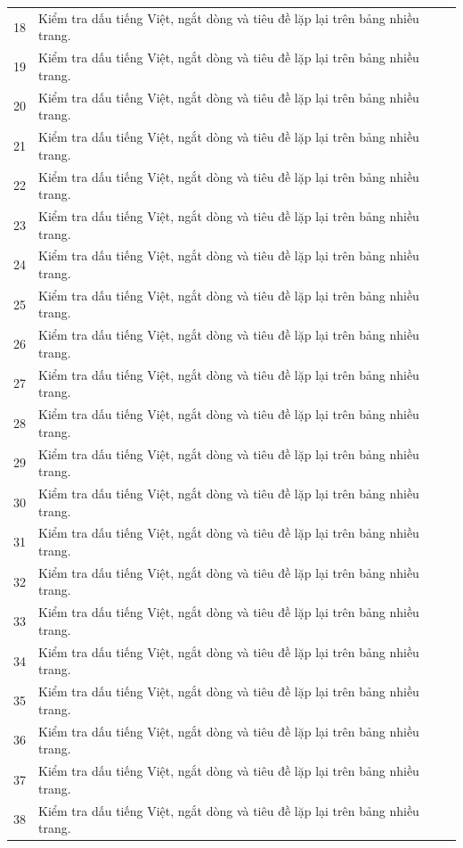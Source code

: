 \documentclass{template/ctu-report}
\begin{document}
\begin{longtable}{p{}p{}}
18 & Kiểm tra dấu tiếng Việt, ngắt dòng và tiêu đề lặp lại trên bảng nhiều trang. \\
19 & Kiểm tra dấu tiếng Việt, ngắt dòng và tiêu đề lặp lại trên bảng nhiều trang. \\
20 & Kiểm tra dấu tiếng Việt, ngắt dòng và tiêu đề lặp lại trên bảng nhiều trang. \\
21 & Kiểm tra dấu tiếng Việt, ngắt dòng và tiêu đề lặp lại trên bảng nhiều trang. \\
22 & Kiểm tra dấu tiếng Việt, ngắt dòng và tiêu đề lặp lại trên bảng nhiều trang. \\
23 & Kiểm tra dấu tiếng Việt, ngắt dòng và tiêu đề lặp lại trên bảng nhiều trang. \\
24 & Kiểm tra dấu tiếng Việt, ngắt dòng và tiêu đề lặp lại trên bảng nhiều trang. \\
25 & Kiểm tra dấu tiếng Việt, ngắt dòng và tiêu đề lặp lại trên bảng nhiều trang. \\
26 & Kiểm tra dấu tiếng Việt, ngắt dòng và tiêu đề lặp lại trên bảng nhiều trang. \\
27 & Kiểm tra dấu tiếng Việt, ngắt dòng và tiêu đề lặp lại trên bảng nhiều trang. \\
28 & Kiểm tra dấu tiếng Việt, ngắt dòng và tiêu đề lặp lại trên bảng nhiều trang. \\
29 & Kiểm tra dấu tiếng Việt, ngắt dòng và tiêu đề lặp lại trên bảng nhiều trang. \\
30 & Kiểm tra dấu tiếng Việt, ngắt dòng và tiêu đề lặp lại trên bảng nhiều trang. \\
31 & Kiểm tra dấu tiếng Việt, ngắt dòng và tiêu đề lặp lại trên bảng nhiều trang. \\
32 & Kiểm tra dấu tiếng Việt, ngắt dòng và tiêu đề lặp lại trên bảng nhiều trang. \\
33 & Kiểm tra dấu tiếng Việt, ngắt dòng và tiêu đề lặp lại trên bảng nhiều trang. \\
34 & Kiểm tra dấu tiếng Việt, ngắt dòng và tiêu đề lặp lại trên bảng nhiều trang. \\
35 & Kiểm tra dấu tiếng Việt, ngắt dòng và tiêu đề lặp lại trên bảng nhiều trang. \\
36 & Kiểm tra dấu tiếng Việt, ngắt dòng và tiêu đề lặp lại trên bảng nhiều trang. \\
37 & Kiểm tra dấu tiếng Việt, ngắt dòng và tiêu đề lặp lại trên bảng nhiều trang. \\
38 & Kiểm tra dấu tiếng Việt, ngắt dòng và tiêu đề lặp lại trên bảng nhiều trang. \\

\end{longtable}
\end{document}
